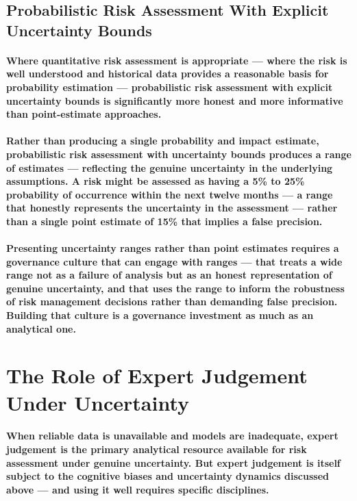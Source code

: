 \subsection{Probabilistic Risk Assessment With Explicit Uncertainty Bounds}
\paragraph{Where quantitative risk assessment is appropriate — where the risk is well understood and historical data provides a reasonable basis for probability estimation — \textbf{probabilistic risk assessment with explicit uncertainty bounds} is significantly more honest and more informative than point-estimate approaches.}
\paragraph{Rather than producing a single probability and impact estimate, probabilistic risk assessment with uncertainty bounds produces a range of estimates — reflecting the genuine uncertainty in the underlying assumptions. A risk might be assessed as having a 5\% to 25\% probability of occurrence within the next twelve months — a range that honestly represents the uncertainty in the assessment — rather than a single point estimate of 15\% that implies a false precision.}
\paragraph{Presenting uncertainty ranges rather than point estimates requires a governance culture that can engage with ranges — that treats a wide range not as a failure of analysis but as an honest representation of genuine uncertainty, and that uses the range to inform the robustness of risk management decisions rather than demanding false precision. Building that culture is a governance investment as much as an analytical one.}

\section{The Role of Expert Judgement Under Uncertainty}
\paragraph{When reliable data is unavailable and models are inadequate, expert judgement is the primary analytical resource available for risk assessment under genuine uncertainty. But expert judgement is itself subject to the cognitive biases and uncertainty dynamics discussed above — and using it well requires specific disciplines.}

